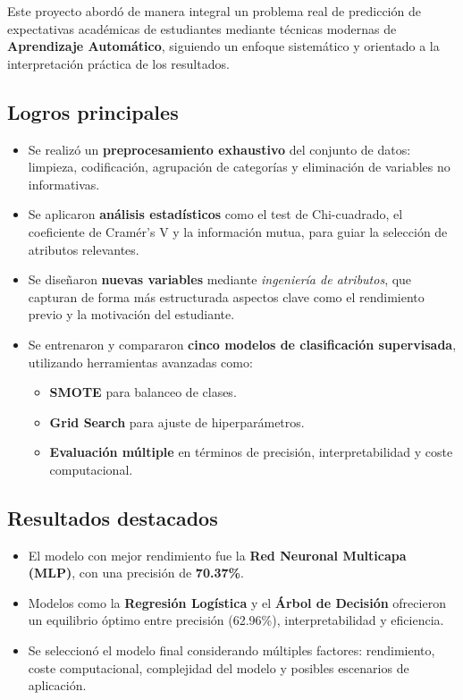 \documentclass[11pt,a4paper]{article}
\begin{document}
Este proyecto abordó de manera integral un problema real de predicción de expectativas académicas de estudiantes mediante técnicas modernas de \textbf{Aprendizaje Automático}, siguiendo un enfoque sistemático y orientado a la interpretación práctica de los resultados.

\subsection*{Logros principales}

\begin{itemize}
    \item Se realizó un \textbf{preprocesamiento exhaustivo} del conjunto de datos: limpieza, codificación, agrupación de categorías y eliminación de variables no informativas.
    \item Se aplicaron \textbf{análisis estadísticos} como el test de Chi-cuadrado, el coeficiente de Cramér’s V y la información mutua, para guiar la selección de atributos relevantes.
    \item Se diseñaron \textbf{nuevas variables} mediante \textit{ingeniería de atributos}, que capturan de forma más estructurada aspectos clave como el rendimiento previo y la motivación del estudiante.
    \item Se entrenaron y compararon \textbf{cinco modelos de clasificación supervisada}, utilizando herramientas avanzadas como:
    \begin{itemize}
        \item \textbf{SMOTE} para balanceo de clases.
        \item \textbf{Grid Search} para ajuste de hiperparámetros.
        \item \textbf{Evaluación múltiple} en términos de precisión, interpretabilidad y coste computacional.
    \end{itemize}
\end{itemize}

\subsection*{Resultados destacados}

\begin{itemize}
    \item El modelo con mejor rendimiento fue la \textbf{Red Neuronal Multicapa (MLP)}, con una precisión de \textbf{70.37\%}.
    \item Modelos como la \textbf{Regresión Logística} y el \textbf{Árbol de Decisión} ofrecieron un equilibrio óptimo entre precisión (62.96\%), interpretabilidad y eficiencia.
    \item Se seleccionó el modelo final considerando múltiples factores: rendimiento, coste computacional, complejidad del modelo y posibles escenarios de aplicación.
\end{itemize}
\end{document}
